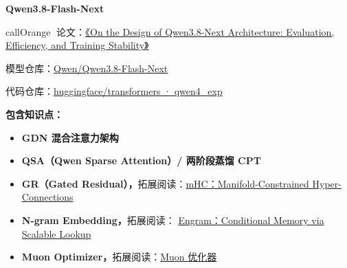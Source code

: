 \documentclass[zihao=false,fontset=windows]{ctexart}
\begin{document}
{\bfseries Qwen3.8-Flash-Next\par}
\begin{feishubox}{callOrange}{📌}
论文：\href{https://arxiv.org/pdf/2608.30320}{《On the Design of Qwen3.8-Next Architecture: Evaluation, Efficiency, and Training Stability》}

模型仓库：\href{https://huggingface.co/Qwen/Qwen3.8-Flash-Next}{Qwen/Qwen3.8-Flash-Next}

代码仓库：\href{https://github.com/huggingface/transformers/tree/main/src/transformers/models/qwen4\_exp}{huggingface/transformers · qwen4\_exp}

\textcolor{feishuRed}{\textbf{包含知识点：}}

\begin{itemize}
\item \textcolor{feishuRed}{\textbf{GDN 混合注意力架构}}
\item \textcolor{feishuRed}{\textbf{QSA（Qwen Sparse Attention）/ 两阶段蒸馏 CPT}}
\item \textcolor{feishuRed}{\textbf{GR（Gated Residual），}}拓展阅读：\href{https://my.feishu.cn/wiki/WsaawrdO3ifrmTk3ab4cSgjBnRb}{mHC：Manifold-Constrained Hyper-Connections}
\item \textcolor{feishuRed}{\textbf{N-gram Embedding，}}拓展阅读： \href{https://my.feishu.cn/wiki/JwXTw0oUeimyoBk2QIgcSfBfn9g}{Engram：Conditional Memory via Scalable Lookup}
\item \textcolor{feishuRed}{\textbf{Muon Optimizer，}}拓展阅读：\href{https://my.feishu.cn/wiki/Hcj2wGTJEiohTikkdEKc7H4Nnlb}{Muon 优化器}
\end{itemize}
\end{feishubox}
\par\vspace{1.15em}\par\vspace{0.28em}
\end{document}
